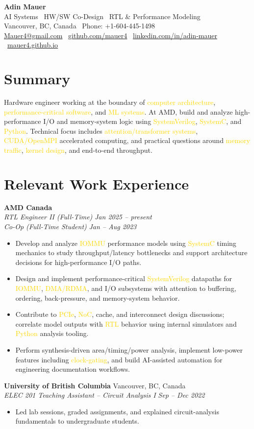 \documentclass[11pt]{article}
\newcommand{\gold}[1]{\textcolor{gold}{#1}}
\newcommand{\resumeItem}[1]{\item\small{#1}}
\newcommand{\resumeSubheading}[4]{%
  \textbf{#1} \hfill #2\\
  \textit{#3} \hfill \textit{#4}\\
}
\begin{document}
\begin{center}
  {\LARGE \textbf{Adin Mauer}}\\
  AI Systems \textbar\ HW/SW Co-Design \textbar\ RTL \& Performance Modeling\\
  Vancouver, BC, Canada \textbar\ Phone: +1-604-445-1498\\
  \href{mailto:Mauer4@gmail.com}{Mauer4@gmail.com} \textbar\ \href{https://github.com/mauer4}{github.com/mauer4} \textbar\ \href{https://www.linkedin.com/in/adin-mauer-4774821a1/}{linkedin.com/in/adin-mauer} \textbar\ \href{https://mauer4.github.io/}{mauer4.github.io}
\end{center}

\section{Summary}
Hardware engineer working at the boundary of \gold{computer architecture}, \gold{performance-critical software}, and \gold{ML systems}. At AMD, build and analyze high-performance I/O and memory-system logic using \gold{SystemVerilog}, \gold{SystemC}, and \gold{Python}. Technical focus includes \gold{attention/transformer systems}, \gold{CUDA/OpenMPI} accelerated computing, and practical questions around \gold{memory traffic}, \gold{kernel design}, and end-to-end throughput.

\section{Relevant Work Experience}
\textbf{AMD Canada}\\
\textit{RTL Engineer II (Full-Time)} \hfill \textit{Jan 2025 -- present}\\
\textit{Co-Op (Full-Time Student)} \hfill \textit{Jan -- Aug 2023}
\begin{itemize}[leftmargin=*]
  \resumeItem{Develop and analyze \gold{IOMMU} performance models using \gold{SystemC} timing mechanics to study throughput/latency bottlenecks and support architecture decisions for high-performance I/O paths.}
  \resumeItem{Design and implement performance-critical \gold{SystemVerilog} datapaths for \gold{IOMMU}, \gold{DMA/RDMA}, and I/O subsystems with attention to buffering, ordering, back-pressure, and memory-system behavior.}
  \resumeItem{Contribute to \gold{PCIe}, \gold{NoC}, cache, and interconnect design discussions; correlate model outputs with \gold{RTL} behavior using internal simulators and \gold{Python} analysis tooling.}
  \resumeItem{Perform synthesis-driven area/timing/power analysis, implement low-power features including \gold{clock-gating}, and build AI-assisted automation for engineering documentation workflows.}
\end{itemize}
\vspace{2pt}
\resumeSubheading{University of British Columbia}{Vancouver, BC, Canada}{ELEC 201 Teaching Assistant -- Circuit Analysis I}{Sep -- Dec 2022}
\vspace{-8pt}
\begin{itemize}[leftmargin=*]
  \resumeItem{Led lab sessions, graded assignments, and explained circuit-analysis fundamentals to undergraduate students.}
\end{itemize}
\end{document}
